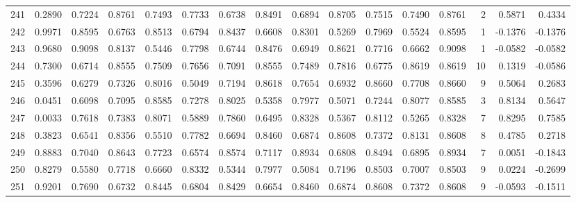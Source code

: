 \begin{tabular}{lrrrrrrrrrrrrrrr}
241 &      0.2890 &  0.7224 &  0.8761 &  0.7493 &  0.7733 &  0.6738 &  0.8491 &  0.6894 &  0.8705 &  0.7515 &   0.7490 &     0.8761 &      2 &                    0.5871 &                     0.4334 \\
242 &      0.9971 &  0.8595 &  0.6763 &  0.8513 &  0.6794 &  0.8437 &  0.6608 &  0.8301 &  0.5269 &  0.7969 &   0.5524 &     0.8595 &      1 &                   -0.1376 &                    -0.1376 \\
243 &      0.9680 &  0.9098 &  0.8137 &  0.5446 &  0.7798 &  0.6744 &  0.8476 &  0.6949 &  0.8621 &  0.7716 &   0.6662 &     0.9098 &      1 &                   -0.0582 &                    -0.0582 \\
244 &      0.7300 &  0.6714 &  0.8555 &  0.7509 &  0.7656 &  0.7091 &  0.8555 &  0.7489 &  0.7816 &  0.6775 &   0.8619 &     0.8619 &     10 &                    0.1319 &                    -0.0586 \\
245 &      0.3596 &  0.6279 &  0.7326 &  0.8016 &  0.5049 &  0.7194 &  0.8618 &  0.7654 &  0.6932 &  0.8660 &   0.7708 &     0.8660 &      9 &                    0.5064 &                     0.2683 \\
246 &      0.0451 &  0.6098 &  0.7095 &  0.8585 &  0.7278 &  0.8025 &  0.5358 &  0.7977 &  0.5071 &  0.7244 &   0.8077 &     0.8585 &      3 &                    0.8134 &                     0.5647 \\
247 &      0.0033 &  0.7618 &  0.7383 &  0.8071 &  0.5889 &  0.7860 &  0.6495 &  0.8328 &  0.5367 &  0.8112 &   0.5265 &     0.8328 &      7 &                    0.8295 &                     0.7585 \\
248 &      0.3823 &  0.6541 &  0.8356 &  0.5510 &  0.7782 &  0.6694 &  0.8460 &  0.6874 &  0.8608 &  0.7372 &   0.8131 &     0.8608 &      8 &                    0.4785 &                     0.2718 \\
249 &      0.8883 &  0.7040 &  0.8643 &  0.7723 &  0.6574 &  0.8574 &  0.7117 &  0.8934 &  0.6808 &  0.8494 &   0.6895 &     0.8934 &      7 &                    0.0051 &                    -0.1843 \\
250 &      0.8279 &  0.5580 &  0.7718 &  0.6660 &  0.8332 &  0.5344 &  0.7977 &  0.5084 &  0.7196 &  0.8503 &   0.7007 &     0.8503 &      9 &                    0.0224 &                    -0.2699 \\
251 &      0.9201 &  0.7690 &  0.6732 &  0.8445 &  0.6804 &  0.8429 &  0.6654 &  0.8460 &  0.6874 &  0.8608 &   0.7372 &     0.8608 &      9 &                   -0.0593 &                    -0.1511 \\

\end{tabular}
